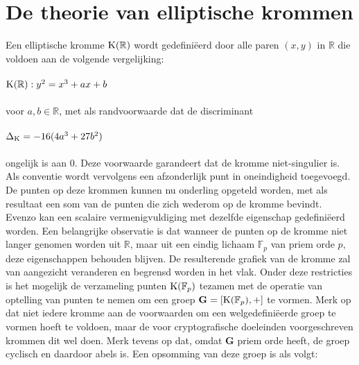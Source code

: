 \documentclass{article}
\begin{document}
\section*{De theorie van elliptische krommen}


Een elliptische kromme $\textup{K}(\mathbb{R})$ wordt gedefini\"{e}erd door alle paren $(x,y)$ in $\mathbb{R}$ die voldoen aan de volgende vergelijking: \\
\\
$\textup{K}(\mathbb{R}): y^{2} = x^{3} + ax + b$ \\
\\
voor $a, b \in \mathbb{R}$, met als randvoorwaarde dat de discriminant \\
\\
$\Delta_{\textup{K}} = -16(4a^{3}+27b^{2})$ \\
\\
ongelijk is aan $0$. Deze voorwaarde garandeert dat de kromme niet-singulier is. Als 
conventie wordt vervolgens een afzonderlijk punt in oneindigheid toegevoegd. De punten op deze krommen kunnen nu onderling opgeteld worden, met als \\
resultaat een som van de punten die zich wederom op de kromme bevindt. Evenzo kan een scalaire vermenigvuldiging met dezelfde eigenschap gedefini\"{e}erd worden.
Een belangrijke observatie is dat wanneer de punten op de kromme niet langer genomen worden uit $\mathbb{R}$, maar uit een eindig lichaam $\mathbb{F}_{p}$ van priem orde $p$, deze
eigenschappen behouden blijven. De resulterende grafiek van de kromme zal van aangezicht veranderen en begrensd worden in het vlak. Onder deze restricties is
het mogelijk de verzameling punten $\textup{K}(\mathbb{F}_{p})$ tezamen met de operatie van optelling van punten te nemen om een groep $\mathbf{G} = [\textup{K}(\mathbb{F}_{p}), +]$ te vormen. Merk op dat niet
iedere kromme aan de voorwaarden om een welgedefini\"{e}erde groep te vormen hoeft te voldoen, maar de voor cryptografische doeleinden voorgeschreven krommen dit 
wel doen. Merk tevens op  dat, omdat $\mathbf{G}$ priem orde heeft, de groep cyclisch en daardoor abels is. Een opsomming van deze groep is als volgt: \\
\end{document}
